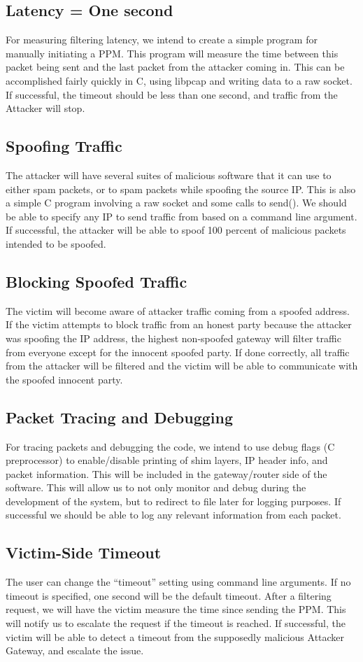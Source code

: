 \documentclass[11pt]{article}
\begin{document}
	\subsection{Latency = One second}
	For measuring filtering latency, we intend to create a simple program for manually initiating a PPM. This program will measure the time between this packet being sent and the last packet from the attacker coming in. This can be accomplished fairly quickly in C, using libpcap and writing data to a raw socket. If successful, the timeout should be less than one second, and traffic from the Attacker will stop.
	\subsection{Spoofing Traffic}
	The attacker will have several suites of malicious software that it can use to either spam packets, or to spam packets while spoofing the source IP. This is also a simple C program involving a raw socket and some calls to send(). We should be able to specify any IP to send traffic from based on a command line argument. If successful, the attacker will be able to spoof 100 percent of malicious packets intended to be spoofed.
	\subsection{Blocking Spoofed Traffic}
	The victim will become aware of attacker traffic coming from a spoofed address.  If the victim attempts to block traffic from an honest party because the attacker was spoofing the IP address, the highest non-spoofed gateway will filter traffic from everyone except for the innocent spoofed party.  If done correctly, all traffic from the attacker will be filtered and the victim will be able to communicate with the spoofed innocent party.
	\subsection{Packet Tracing and Debugging}
	For tracing packets and debugging the code, we intend to use debug flags (C preprocessor) to enable/disable printing of shim layers, IP header info, and packet information. This will be included in the gateway/router side of the software. This will allow us to not only monitor and debug during the development of the system, but to redirect to file later for logging purposes. If successful we should be able to log any relevant information from each packet.
	\subsection{Victim-Side Timeout}
	The user can change the “timeout” setting using command line arguments. If no timeout is specified, one second will be the default timeout. After a filtering request, we will have the victim measure the time since sending the PPM. This will notify us to escalate the request if the timeout is reached. If successful, the victim will be able to detect a timeout from the supposedly malicious Attacker Gateway, and escalate the issue.
\end{document}
